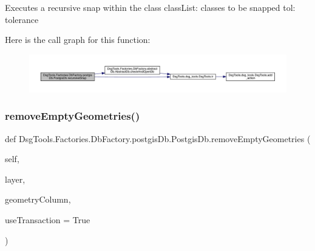 \begin{DoxyVerb}Executes a recursive snap within the class
classList: classes to be snapped
tol: tolerance
\end{DoxyVerb}
 Here is the call graph for this function\+:
\nopagebreak
\begin{figure}[H]
\begin{center}
\leavevmode
\includegraphics[width=350pt]{class_dsg_tools_1_1_factories_1_1_db_factory_1_1postgis_db_1_1_postgis_db_a378ae922a6592089abe153fb9fcd52ec_cgraph}
\end{center}
\end{figure}
\mbox{\label{class_dsg_tools_1_1_factories_1_1_db_factory_1_1postgis_db_1_1_postgis_db_aaca6eee19521634d0f73a2e9281ef149}} 
\subsubsection{\texorpdfstring{remove\+Empty\+Geometries()}{removeEmptyGeometries()}}
{\footnotesize\ttfamily def Dsg\+Tools.\+Factories.\+Db\+Factory.\+postgis\+Db.\+Postgis\+Db.\+remove\+Empty\+Geometries (\begin{DoxyParamCaption}\item[{}]{self,  }\item[{}]{layer,  }\item[{}]{geometry\+Column,  }\item[{}]{use\+Transaction = {\ttfamily True} }\end{DoxyParamCaption})}

